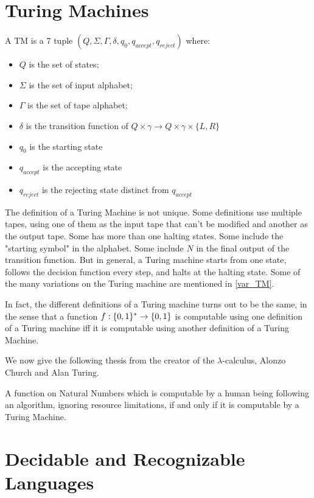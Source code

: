 \documentclass{report}
\begin{document}
	\section{Turing Machines}
		\begin{defn} \label{def_tm}
			A TM is a 7 tuple $(Q,\Sigma,\Gamma,\delta,q_0,q_{accept},q_{reject})$ where:
			\begin{itemize}
				\item $Q$ is the set of states;
				\item $\Sigma$ is the set of input alphabet;
				\item $\Gamma$ is the set of tape alphabet;
				\item $\delta$ is the transition function of $Q \times \gamma \rightarrow Q \times \gamma \times \{L,R\}$
				\item $q_0$ is the starting state
				\item $q_{accept}$ is the accepting state
				\item $q_{reject}$ is the rejecting state distinct from $q_{accept}$
			\end{itemize}
		\end{defn}
		The definition of a Turing Machine is not unique. Some definitions use multiple tapes, using one of them as the input tape that can't be modified and another as the output tape. Some has more than one halting states. Some include the "starting symbol" in the alphabet. Some include $N$ in the final output of the transition function. But in general, a Turing machine starts from one state, follows the decision function every step, and halts at the halting state. Some of the many variations on the Turing machine are mentioned in \ref{var_TM}.
		
		In fact, the different definitions of a Turing machine turns out to be the same, in the sense that a function $f:\{0,1\}^\ast \rightarrow \{0,1\}$ is computable using one definition of a Turing machine iff it is computable using another definition of a Turing Machine.
		
		We now give the following thesis from the creator of the $\lambda$-calculus, Alonzo Church and Alan Turing.
		\begin{thesis} \label{thm_church_turing}
			A function on Natural Numbers which is computable by a human being following an algorithm, ignoring resource limitations, if and only if it is computable by a Turing Machine.
		\end{thesis}
		
		\section{Decidable and Recognizable Languages}
		
\end{document}
